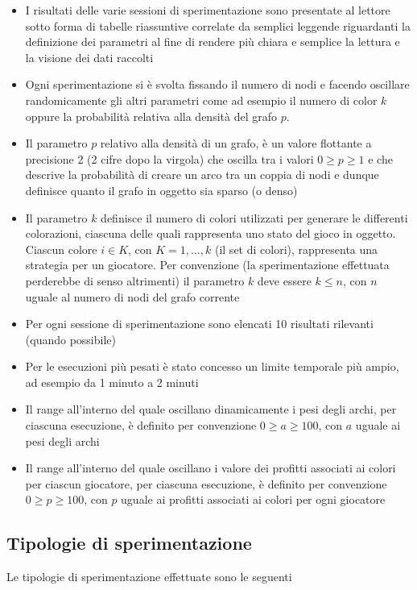 \begin{itemize}
	\item I risultati delle varie sessioni di sperimentazione sono presentate al lettore sotto forma di tabelle riassuntive correlate da semplici leggende riguardanti la definizione dei parametri al fine di rendere più chiara e semplice la lettura e la visione dei dati raccolti
	\item Ogni sperimentazione si è svolta fissando il numero di nodi e facendo oscillare randomicamente gli altri parametri come ad esempio il numero di color $k$ oppure la probabilità relativa alla densità del grafo $p$.\\
	\item Il parametro $p$ relativo alla densità di un grafo, è un valore flottante a precisione 2 (2 cifre dopo la virgola) che oscilla tra i valori \(0 \geq p \geq 1\) e che descrive la probabilità di creare un arco tra un coppia di nodi e dunque definisce quanto il grafo in oggetto sia sparso (o denso)
	\item Il parametro $k$ definisce il numero di colori utilizzati per generare le differenti colorazioni, ciascuna delle quali rappresenta uno stato del gioco in oggetto. Ciascun colore \(i \in K\), con \(K = 1,\ldots,k\) (il set di colori), rappresenta una strategia per un giocatore. Per convenzione (la sperimentazione effettuata perderebbe di senso altrimenti) il parametro $k$ deve essere \(k \leq n\), con $n$ uguale al numero di nodi del grafo corrente
	\item Per ogni sessione di sperimentazione sono elencati 10 risultati rilevanti (quando possibile)
	\item Per le esecuzioni più pesati è stato concesso un limite temporale più ampio, ad esempio da 1 minuto a 2 minuti
	\item Il range all'interno del quale oscillano dinamicamente i pesi degli archi, per ciascuna esecuzione, è definito per convenzione \(0 \geq a \geq 100\), con $a$ uguale ai pesi degli archi
	\item Il range all'interno del quale oscillano i valore dei profitti associati ai colori per ciascun giocatore, per ciascuna esecuzione, è definito per convenzione \(0 \geq p \geq 100\), con $p$ uguale ai profitti associati ai colori per ogni giocatore
\end{itemize}

\subsection{Tipologie di sperimentazione}
\justify
Le tipologie di sperimentazione effettuate sono le seguenti

